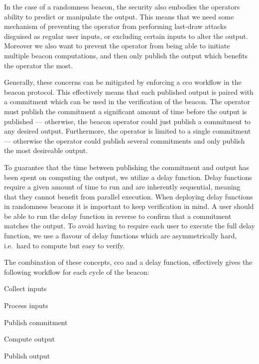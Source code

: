 In the case of a randomness beacon, the security also embodies the operators ability to predict or manipulate the output.
This means that we need some mechanism of preventing the operator from performing last-draw attacks disguised as regular user inputs, or excluding certain inputs to alter the output.
Moreover we also want to prevent the operator from being able to initiate multiple beacon computations, and then only publish the output which benefits the operator the most.

Generally, these concerns can be mitigated by enforcing a \gls{cco} workflow in the beacon protocol.
This effectively means that each published output is paired with a commitment which can be used in the verification of the beacon.
The operator must publish the commitment a significant amount of time before the output is published --- otherwise, the beacon operator could just publish a commitment to any desired output. Furthermore, the operator is limited to a single commitment --- otherwise the operator could publish several commitments and only publish the most desireable output.

To guarantee that the time between publishing the commitment and output has been spent on computing the output, we utilize a delay function.
Delay functions require a given amount of time to run and are inherently sequential, meaning that they cannot benefit from parallel execution.
When deploying delay functions in randomness beacons it is important to keep verification in mind.
A user should be able to run the delay function in reverse to confirm that a commitment matches the output.
To avoid having to require each user to execute the full delay function, we use a flavour of delay functions which are asymmetrically hard, i.e.\ hard to compute but easy to verify.

The combination of these concepts, \gls{cco} and a delay function, effectively gives the following workflow for each cycle of the beacon:

\begin{enumberate}
    \item Collect inputs
    \item Process inputs
    \item Publish commitment
    \item Compute output
    \item Publish output
\end{enumberate}

